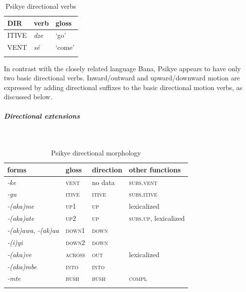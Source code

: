 \begin{table}[H]
	\caption{Psikye directional verbs} 
	\label{tab:psikV}
	\begin{tabular}{lll} %
		\lsptoprule
		DIR & verb & gloss   \\ %
		\midrule
		ITIVE & \textit{dze} & `go' \\
		VENT & \textit{sé} & `come' \\
		\lspbottomrule
	\end{tabular}
\end{table}

In contrast with the closely related language Bana, Psikye appears to have only two basic directional verbs. Inward/outward and upward/downward motion are expressed by adding directional suffixes to the basic directional motion verbs, as discussed below. 

\subparagraph{Directional extensions}~

\begin{table}[H]
	\caption{Psikye directional morphology}
	\label{tab:psik}
	\begin{tabular}{llll} %
		\lsptoprule
		forms & gloss & direction  & other functions  \\ %
		\midrule
		\textit{-ke}  &  \textsc{vent}  &  no data &  \textsc{subs.vent}  \\
		\textit{-gu}  &  \textsc{itive}  & \textsc{itive}  &   \textsc{subs.itive}  \\
		\textit{-(aka)me}  &  \textsc{up1}  &    \textsc{up} &  lexicalized  \\
		\textit{-(aka)ate}  &  \textsc{up2}  &   \textsc{up}  &  \textsc{subs.up}, lexicalized \\
		\textit{-(ak)awa}, \textit{-(ak)aa}   &  \textsc{down1}  &  \textsc{down}  &    \\
		\textit{-(i)yi} &  \textsc{down2}  &   \textsc{down}  &    \\
		\textit{-(aka)ve}  &  \textsc{across}  &    \textsc{out}  & lexicalized \\
		\textit{-(aka)mbe}  &  \textsc{into}  &   \textsc{into} &       \\
		\textit{-mte}  &  \textsc{bush}  &   \textsc{bush}   &   \textsc{compl}  \\
		\lspbottomrule
	\end{tabular}
\end{table} 

